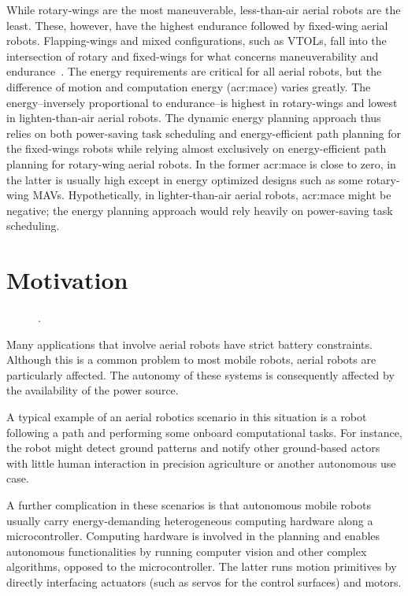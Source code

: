 While rotary-wings are the most maneuverable, less-than-air aerial robots are the least. These, however, have the highest endurance followed by fixed-wing aerial robots. Flapping-wings and mixed configurations, such as VTOLs, fall into the intersection of rotary and fixed-wings for what concerns maneuverability and endurance~\citep{siciliano2016springer}. The energy requirements are critical for all aerial robots, but the difference of motion and computation energy (\Gls{acr:mace}) varies greatly. The energy--inversely proportional to endurance--is highest in rotary-wings and lowest in lighten-than-air aerial robots. The dynamic energy planning approach thus relies on both power-saving task scheduling and energy-efficient path planning for the fixed-wings robots while relying almost exclusively on energy-efficient path planning for rotary-wing aerial robots. In the former \Gls{acr:mace} is close to zero, in the latter is usually high except in energy optimized designs such as some rotary-wing MAVs. Hypothetically, in lighter-than-air aerial robots, \Gls{acr:mace} might be negative; the energy planning approach would rely heavily on power-saving task scheduling.


\section{Motivation}
\label{sec:motivation}

\begin{figure}[t!]
  \centering
  \footnotesize{}\selectfont
  
  \caption[.]{.}
  \label{fig:plot10}
\end{figure}

Many applications that involve aerial robots have strict battery constraints. Although this is a common problem to most mobile robots, aerial robots are particularly affected. The autonomy of these systems is consequently affected by the availability of the power source. 

A typical example of an aerial robotics scenario in this situation is a robot following a path and performing some onboard computational tasks. For instance, the robot might detect ground patterns and notify other ground-based actors with little human interaction in precision agriculture or another autonomous use case.

A further complication in these scenarios is that autonomous mobile robots usually carry energy-demanding heterogeneous computing hardware along a microcontroller. Computing hardware is involved in the planning and enables autonomous functionalities by running computer vision and other complex algorithms, opposed to the microcontroller. The latter runs motion primitives by directly interfacing actuators (such as servos for the control surfaces) and motors.

